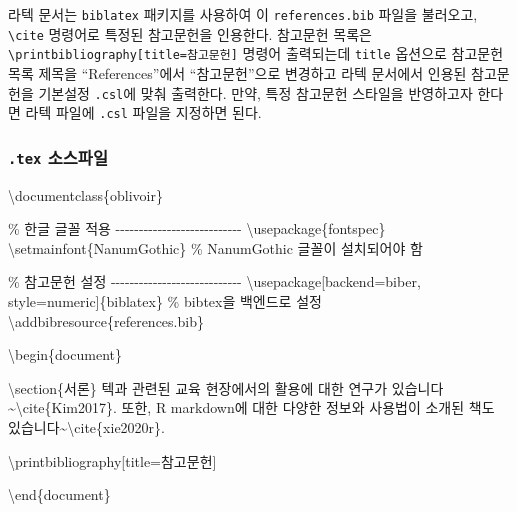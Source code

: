 \documentclass[
  letterpaper,
]{book}
\newenvironment{Shaded}{\begin{snugshade}}{\end{snugshade}}
\newcommand{\BuiltInTok}[1]{\textcolor[rgb]{0.00,0.23,0.31}{#1}}
\newcommand{\CommentTok}[1]{\textcolor[rgb]{0.37,0.37,0.37}{#1}}
\newcommand{\ExtensionTok}[1]{\textcolor[rgb]{0.00,0.23,0.31}{#1}}
\newcommand{\FunctionTok}[1]{\textcolor[rgb]{0.28,0.35,0.67}{#1}}
\newcommand{\KeywordTok}[1]{\textcolor[rgb]{0.00,0.23,0.31}{#1}}
\newcommand{\NormalTok}[1]{\textcolor[rgb]{0.00,0.23,0.31}{#1}}
\begin{document}
라텍 문서는 \texttt{biblatex} 패키지를 사용하여 이
\texttt{references.bib} 파일을 불러오고, \texttt{\textbackslash{}cite}
명령어로 특정된 참고문헌을 인용한다. 참고문헌 목록은
\texttt{\textbackslash{}printbibliography{[}title=참고문헌{]}} 명령어
출력되는데 \texttt{title} 옵션으로 참고문헌목록 제목을
``References''에서 ``참고문헌''으로 변경하고 라텍 문서에서 인용된
참고문헌을 기본설정 \texttt{.csl}에 맞춰 출력한다. 만약, 특정 참고문헌
스타일을 반영하고자 한다면 라텍 파일에 \texttt{.csl} 파일을 지정하면
된다.

\hypertarget{tex-uxc18cuxc2a4uxd30cuxc77c}{%
\subsubsection{\texorpdfstring{\texttt{.tex}
소스파일}{.tex 소스파일}}\label{tex-uxc18cuxc2a4uxd30cuxc77c}}

\begin{Shaded}
\begin{Highlighting}[]
\BuiltInTok{\textbackslash{}documentclass}\NormalTok{\{}\ExtensionTok{oblivoir}\NormalTok{\}}

\CommentTok{\% 한글 글꼴 적용 {-}{-}{-}{-}{-}{-}{-}{-}{-}{-}{-}{-}{-}{-}{-}{-}{-}{-}{-}{-}{-}{-}{-}{-}{-}{-}{-}}
\BuiltInTok{\textbackslash{}usepackage}\NormalTok{\{}\ExtensionTok{fontspec}\NormalTok{\}}
\FunctionTok{\textbackslash{}setmainfont}\NormalTok{\{NanumGothic\} }\CommentTok{\% NanumGothic 글꼴이 설치되어야 함}

\CommentTok{\% 참고문헌 설정 {-}{-}{-}{-}{-}{-}{-}{-}{-}{-}{-}{-}{-}{-}{-}{-}{-}{-}{-}{-}{-}{-}{-}{-}{-}{-}{-}{-}}
\BuiltInTok{\textbackslash{}usepackage}\NormalTok{[backend=biber, style=numeric]\{}\ExtensionTok{biblatex}\NormalTok{\} }\CommentTok{\% bibtex을 백엔드로 설정}
\FunctionTok{\textbackslash{}addbibresource}\NormalTok{\{references.bib\}}

\KeywordTok{\textbackslash{}begin}\NormalTok{\{}\ExtensionTok{document}\NormalTok{\}}
    
    \KeywordTok{\textbackslash{}section}\NormalTok{\{서론\}}
\NormalTok{    텍과 관련된 교육 현장에서의 활용에 대한 연구가 있습니다\textasciitilde{}}\KeywordTok{\textbackslash{}cite}\NormalTok{\{}\ExtensionTok{Kim2017}\NormalTok{\}. }
\NormalTok{    또한, R markdown에 대한 다양한 정보와 사용법이 소개된 책도 있습니다\textasciitilde{}}\KeywordTok{\textbackslash{}cite}\NormalTok{\{}\ExtensionTok{xie2020r}\NormalTok{\}.}
    
    \FunctionTok{\textbackslash{}printbibliography}\NormalTok{[title=참고문헌]}
    
\KeywordTok{\textbackslash{}end}\NormalTok{\{}\ExtensionTok{document}\NormalTok{\}}
\end{Highlighting}
\end{Shaded}
\end{document}
